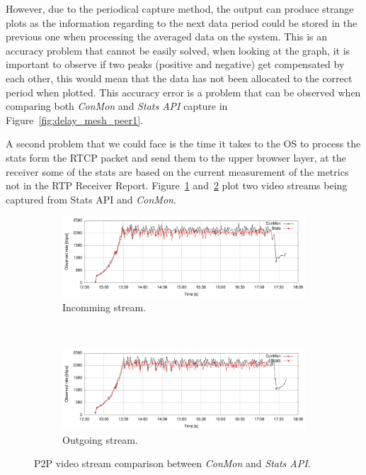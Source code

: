 However, due to the periodical capture method, the output can produce strange plots as the information regarding to the next data period could be stored in the previous one when processing the averaged data on the system. This is an accuracy problem that cannot be easily solved, when looking at the graph, it is important to observe if two peaks (positive and negative) get compensated by each other, this would mean that the data has not been allocated to the correct period when plotted. This accuracy error is a problem that can be observed when comparing both {\it ConMon} and {\it Stats API} capture in Figure~\ref{fig:delay_mesh_peer1}. 

A second problem that we could face is the time it takes to the OS to process the stats form the RTCP packet and send them to the upper browser layer, at the receiver some of the stats are based on the current measurement of the metrics not in the RTP Receiver Report. Figure~\ref{fig:p2pincommingStatsConmonWifi} and~\ref{fig:p2poutgoingStatsConmonWifi} plot two video streams being captured from Stats API and {\it ConMon}.

\begin{figure}[h]
        \centering
        \begin{subfigure}[b]{0.5\textwidth}
                \centering
                \includegraphics[width=\textwidth]{./figures/p2p_incomming_cable_sample.pdf}
               \caption[Incomming stream]{Incomming stream.}
			\label{fig:p2pincommingStatsConmonWifi}
        \end{subfigure}%
        ~ %
        \begin{subfigure}[b]{0.5\textwidth}
                \centering
                \includegraphics[width=\textwidth]{./figures/p2p_outgoing_cable_sample.pdf}
               \caption[Outgoing stream]{Outgoing stream.}
			\label{fig:p2poutgoingStatsConmonWifi}
	        \end{subfigure}
        \caption[P2P video stream comparison between {\it ConMon} and {\it Stats API}]{P2P video stream comparison between {\it ConMon} and {\it Stats API}.}
        \label{fig:p2pStatsConmon}
\end{figure}

